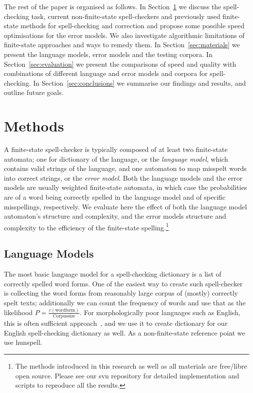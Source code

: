 \documentclass[11pt]{article}
\begin{document}
The rest of the paper is organised as follows. In Section~\ref{sec:methods} we
discuss the spell-checking task, current non-finite-state spell-checkers and
previously used finite-state methods for spell-checking and correction and
propose some possible speed optimisations for the error models.
We also investigate algorithmic limitations of finite-state approaches and
ways to remedy them. In
Section~\ref{sec:materials} we present the language models, error models and the
testing corpora. In Section~\ref{sec:evaluation} we
present the comparisons of speed and quality with combinations of different
language and error models and corpora for spell-checking. In
Section~\ref{sec:conclusions} we summarise our findings and results,
and outline future goals.


\section{Methods}
\label{sec:methods}

A finite-state spell-checker is typically composed of at least two finite-state
automata; one for dictionary of the language, or the \emph{language model},
which contains valid strings of the language, and one automaton to map misspelt
words into correct strings, or the \emph{error model}. Both the language models
and the error models are usually weighted finite-state automata, in which
case the probabilities are of a word being correctly spelled in the language
model and of specific misspellings, respectively.
We evaluate here the effect of both the language model automaton's structure
and complexity, and the error models structure and complexity to the efficiency
of the finite-state spelling.\footnote{The methods introduced in this research
as well as all materials are free/libre open source. Please see our svn
repository for detailed implementation and scripts to reproduce all the
results.}

\subsection{Language Models}
\label{subsec:language-models}

The most basic language model for a spell-checking dictionary is a list of
correctly spelled word forms. One of the easiest way to create such 
spell-checker is collecting the word forms from reasonably large corpus of
(mostly) correctly spelt texts; additionally we can count the frequency of words
and use that as the likelihood $P=\frac{c(\mathrm{wordform})}{\mathrm{Corpus size}}$.
For morphologically poor languages such as English, this is often sufficient
approach~\cite{norvig/2010}, and we use it to create dictionary for our English
spell-checking dictionary as well. As a non-finite-state reference point we use
hunspell.
\end{document}
